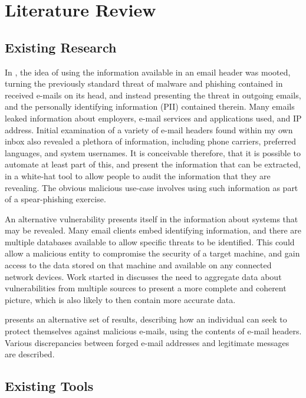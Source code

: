 \chapter{Literature Review}\label{chap:exres}

\section{Existing Research}
In \cite{nurse2015investigating}, the idea of using the information available in an email header was mooted, turning the previously standard threat of malware and phishing contained in received e-mails on its head, and instead presenting the threat in outgoing emails, and the personally identifying information (PII) contained therein.  Many emails leaked information about employers, e-mail services and applications used, and IP address.  Initial examination of a variety of e-mail headers found within my own inbox also revealed a plethora of information, including phone carriers, preferred languages, and system usernames.  It is conceivable therefore, that it is possible to automate at least part of this, and present the information that can be extracted, in a white-hat tool to allow people to audit the information that they are revealing.  The obvious malicious use-case involves using such information as part of a spear-phishing exercise.

An alternative vulnerability presents itself in the information about systems that may be revealed.  Many email clients embed identifying information, and there are multiple databases available to allow specific threats to be identified.  This could allow a malicious entity to compromise the security of a target machine, and gain access to the data stored on that machine and available on any connected network devices.  Work started in \cite{joshi2013extracting} discusses the need to aggregate data about vulnerabilities from multiple sources to present a more complete and coherent picture, which is also likely to then contain more accurate data.

\cite{Al-zarouni_tracinge-mail} presents an alternative set of results, describing how an individual can seek to protect themselves against malicious e-mails, using the contents of e-mail headers.  Various discrepancies between forged e-mail addresses and legitimate messages are described.

\section{Existing Tools}

